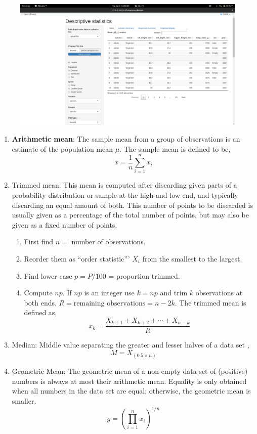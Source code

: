 \begin{figure}
  \centering
  \includegraphics[width=\textwidth]{figures/Descriptive1}
  \end{figure}
\begin{enumerate}
\item {\bf Arithmetic mean}: The sample mean from a group of observations is an estimate of the population mean $\mu$.  The sample mean is defined to be,
\[
\bar{x}= \frac{1}{n}\sum^n_{i=1}x_i
\]
\item Trimmed mean: This mean is computed after discarding given parts of a probability distribution or sample at the high and low end, and typically discarding an equal amount of both. This number of points to be discarded is usually given as a percentage of the total number of points, but may also be given as a fixed number of points. 
\begin{enumerate}
\item First find $n =$ number of observations.
\item Reorder them as ``order statistic''' $X_i$ from the smallest to the largest.
\item Find lower case $p=P/100$ = proportion trimmed.
\item Compute $np$. If $np$ is an integer use $k=np$ and trim $k$ observations at both ends. $R = \mbox{remaining observations} = n-2k$. The trimmed mean is defined as,
\[
\bar{x}_{k} = \frac{X_{k+1}+X_{k+2}+\cdots+X_{n-k}}{R} 
\]
\end{enumerate}
\item Median: Middle value separating the greater and lesser halves of a data set ,
\[
M = X_{(0.5 \times n)}
\]
\item Geometric Mean: The geometric mean of a non-empty data set of (positive) numbers is always at most their arithmetic mean. Equality is only obtained when all numbers in the data set are equal; otherwise, the geometric mean is smaller. 
\[
g = \left(\prod^n_{i=1}x_i\right)^{1/n}
\]
\end{enumerate}


